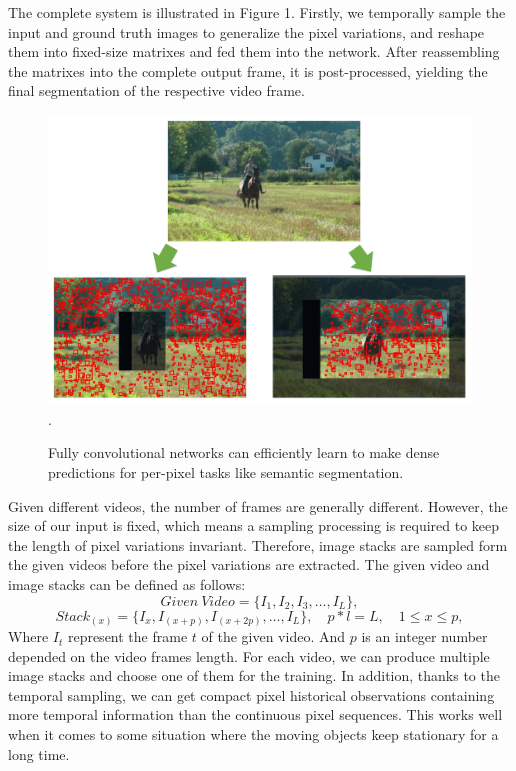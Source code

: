 \documentclass[journal]{IEEEtran}
\begin{document}
The complete system is illustrated in Figure 1. 
Firstly, we temporally sample the input and ground truth images to generalize the pixel variations, and reshape them into fixed-size matrixes and fed them into the network. 
After reassembling the matrixes into the complete output frame, it is post-processed, yielding the final segmentation of the respective video frame.
\begin{figure}[!t]	%
\centering
\includegraphics[width=\textwidth]{figure/fig2}
\DeclareGraphicsExtensions.
    \caption{Fully convolutional networks can efficiently learn to make dense predictions for per-pixel tasks like semantic segmentation.}
    \label{flow_chart}
\end{figure}



Given different videos, the number of frames are generally different. 
However, the size of our input is fixed, which means a sampling processing is required to keep the length of pixel variations invariant. 
Therefore, image stacks are sampled form the given videos before the pixel variations are extracted. 
The given video and image stacks can be defined as follows: 
\begin{equation}
	Given \  Video=\{ I_1,I_2,I_3,\dots,I_L\} ,
\end{equation}
\begin{equation}
Stack_{(x)}=\{I_x,I_{(x+p)},I_{(x+2p)},\dots,I_L \},\quad p*l=L,\quad 1\leq   x\leq p , 
\end{equation}
Where $I_t$ represent the frame $t$ of the given video. 
And $p$ is an integer number depended on the video frames length. 
For each video, we can produce multiple image stacks and choose one of them for the training. 
In addition, thanks to the temporal sampling, we can get compact pixel historical observations containing more temporal information than the continuous pixel sequences. 
This works well when it comes to some situation where the moving objects keep stationary for a long time. 
\end{document}

